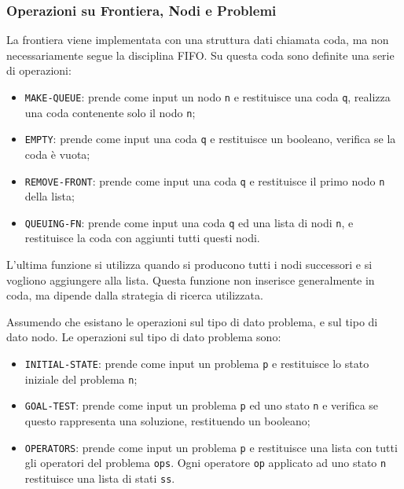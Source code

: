 \documentclass{article}
\numberwithin{equation}{subsection}
\begin{document}
\subsubsection{Operazioni su Frontiera, Nodi e Problemi}

La frontiera viene implementata con una struttura dati chiamata coda, ma non necessariamente 
segue la disciplina FIFO. Su questa coda sono definite una serie di operazioni:
\begin{itemize}
    \item \color{magenta}\verb|MAKE-QUEUE|\color{black}: prende come input un nodo \verb|n| e restituisce una coda \verb|q|, realizza una coda contenente solo il nodo \verb|n|;
    \item \color{magenta}\verb|EMPTY|\color{black}: prende come input una coda \verb|q| e restituisce un booleano, verifica se la coda è vuota;
    \item \color{magenta}\verb|REMOVE-FRONT|\color{black}: prende come input una coda \verb|q| e restituisce il primo nodo \verb|n| della lista; 
    \item \color{magenta}\verb|QUEUING-FN|\color{black}: prende come input una coda \verb|q| ed una lista di nodi \verb|n|, e restituisce la coda con aggiunti tutti questi nodi. 
\end{itemize}
L'ultima funzione si utilizza quando si producono tutti i nodi successori e si vogliono aggiungere 
alla lista. 
Questa funzione non inserisce generalmente in coda, ma dipende dalla strategia di ricerca 
utilizzata. 

Assumendo che esistano le operazioni sul tipo di dato problema, e sul tipo di dato nodo. Le 
operazioni sul tipo di dato problema sono:
\begin{itemize}
    \item \color{magenta}\verb|INITIAL-STATE|\color{black}: prende come input un problema \verb|p| e restituisce lo stato iniziale del problema \verb|n|;
    \item \color{magenta}\verb |GOAL-TEST|\color{black}: prende come input un problema \verb|p| ed uno stato \verb|n| e verifica se questo rappresenta una soluzione, restituendo un booleano;
    \item \color{magenta}\verb|OPERATORS|\color{black}: prende come input un problema \verb|p| e restituisce una lista con tutti gli operatori del problema \verb|ops|. Ogni operatore \verb|op| applicato ad uno stato \verb|n| restituisce una lista di stati \verb|ss|. 
\end{itemize}
\end{document}
